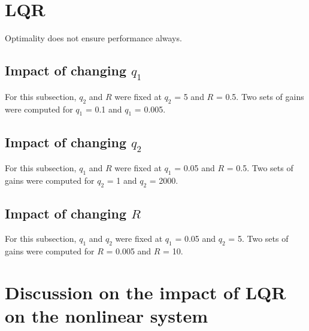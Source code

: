 \documentclass[10pt]{article}
\begin{document}
\section{LQR}
Optimality does not ensure performance always.

\subsection{Impact of changing $q_1$}
For this subsection, $q_2$ and $R$ were fixed at $q_2$ = 5 and $R$ = 0.5. Two sets of gains were computed for $q_1$ = 0.1 and $q_1$ = 0.005.

\subsection{Impact of changing $q_2$}
For this subsection, $q_1$ and $R$ were fixed at $q_1$ = 0.05 and $R$ = 0.5. Two sets of gains were computed for $q_2$ = 1 and $q_2$ = 2000.

\subsection{Impact of changing $R$}
For this subsection, $q_1$ and $q_2$ were fixed at $q_1$ = 0.05 and $q_2$ = 5. Two sets of gains were computed for $R$ = 0.005 and $R$ = 10.

\section{Discussion on the impact of LQR on the nonlinear system}
\end{document}
